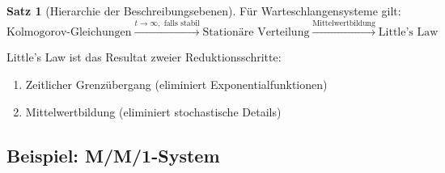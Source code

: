 ﻿\documentclass[a4paper,12pt]{report}
\theoremstyle{definition}
\newtheorem{satz}{Satz}[section]
\begin{document}
\begin{satz}[Hierarchie der Beschreibungsebenen]
	Für Warteschlangensysteme gilt:
	\begin{equation}
		\text{Kolmogorov-Gleichungen} \xrightarrow{t \to \infty, \text{ falls stabil}} \text{Stationäre Verteilung} \xrightarrow{\text{Mittelwertbildung}} \text{Little's Law}
	\end{equation}
	
	Little's Law ist das Resultat zweier Reduktionsschritte:
	\begin{enumerate}
		\item[-] Zeitlicher Grenzübergang (eliminiert Exponentialfunktionen)
		\item[-] Mittelwertbildung (eliminiert stochastische Details)
	\end{enumerate}
\end{satz}

\subsection{Beispiel: M/M/1-System}
\end{document}
